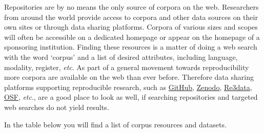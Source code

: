 \documentclass[
  letterpaper,
]{latex/krantz}
\begin{document}
Repositories are by no means the only source of corpora on the web.
Researchers from around the world provide access to corpora and other
data sources on their own sites or through data sharing platforms.
Corpora of various sizes and scopes will often be accessible on a
dedicated homepage or appear on the homepage of a sponsoring
institution. Finding these resources is a matter of doing a web search
with the word `corpus' and a list of desired attributes, including
language, modality, register, \emph{etc}. As part of a general movement
towards reproducibility more corpora are available on the web than ever
before. Therefore data sharing platforms supporting reproducible
research, such as \href{https://github.com/}{GitHub},
\href{https://zenodo.org/}{Zenodo},
\href{http://www.re3data.org/}{Re3data}, \href{https://osf.io/}{OSF},
\emph{etc}., are a good place to look as well, if searching repositories
and targeted web searches do not yield results.

In the table below you will find a list of corpus resources and
datasets.
\end{document}
